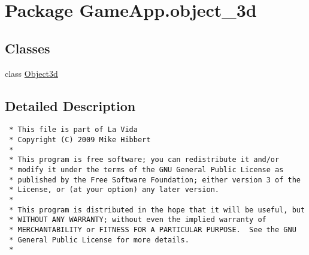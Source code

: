 \hypertarget{namespaceGameApp_1_1object__3d}{
\section{Package GameApp.object\_\-3d}
\label{namespaceGameApp_1_1object__3d}
}


\subsection*{Classes}
\begin{CompactItemize}
\item 
class \hyperlink{classGameApp_1_1object__3d_1_1Object3d}{Object3d}
\end{CompactItemize}


\subsection{Detailed Description}


\footnotesize\begin{verbatim}
 * This file is part of La Vida
 * Copyright (C) 2009 Mike Hibbert
 *
 * This program is free software; you can redistribute it and/or
 * modify it under the terms of the GNU General Public License as
 * published by the Free Software Foundation; either version 3 of the
 * License, or (at your option) any later version.
 *
 * This program is distributed in the hope that it will be useful, but
 * WITHOUT ANY WARRANTY; without even the implied warranty of
 * MERCHANTABILITY or FITNESS FOR A PARTICULAR PURPOSE.  See the GNU
 * General Public License for more details.
 *
\end{verbatim}
\normalsize
 